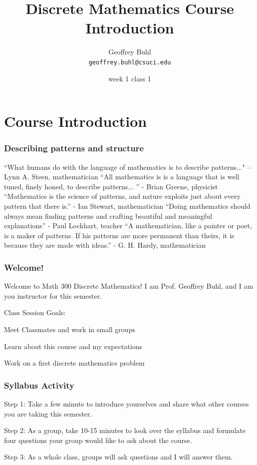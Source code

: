 \documentclass{beamer}
\title{Discrete Mathematics Course Introduction}
\author[Geoffrey Buhl]{Geoffrey Buhl \\ \texttt{geoffrey.buhl@csuci.edu}}
\institute[CSUCI]{California State University Channel Islands}
\date{week 1 class 1}
\newenvironment{packed_enum}{
\begin{enumerate}
  \setlength{\itemsep}{1pt}
  \setlength{\parskip}{0pt}
  \setlength{\parsep}{0pt}
}{\end{enumerate}}
\begin{document}


\section{Course Introduction}

\frame
{
  \frametitle{Describing patterns and structure}

``What humans do with the language of mathematics is to describe 
      patterns..."  --  Lynn A. Steen, mathematician
\vfill
``All mathematics is is a language that is well tuned, finely honed, to describe patterns... '' - Brian Greene, physicist
\vfill
``Mathematics is the science of patterns, and nature exploits just about every pattern that there is.'' - Ian Stewart, mathematician
\vfill
``Doing mathematics should always mean finding patterns and crafting beautiful and meaningful explanations'' - Paul Lockhart, teacher
\vfill
``A mathematician, like a painter or poet, is a maker of patterns. If his patterns are more permanent than theirs, it is because they are made with ideas.'' - G. H. Hardy, mathematician

}

\frame
{
  \frametitle{Welcome!}


Welcome to Math 300 Discrete Mathematics!  I am Prof. Geoffrey Buhl, and I am you instructor for this semester.

\vfill
Class Session Goals:
\begin{packed_enum}
\item Meet Classmates and work in small groups
\item Learn about this course and my expectations
\item Work on a first discrete mathematics problem
\end{packed_enum}


}



\frame
{
  \frametitle{Syllabus Activity}


Step 1: Take a few minute to introduce yourselves and share what other courses you are taking this semester.  

Step 2: As a group, take 10-15 minutes to look over the syllabus and formulate four questions your group would like to ask about the course.

Step 3:  As a whole class, groups will ask questions and I will answer them.

}
\end{document}

